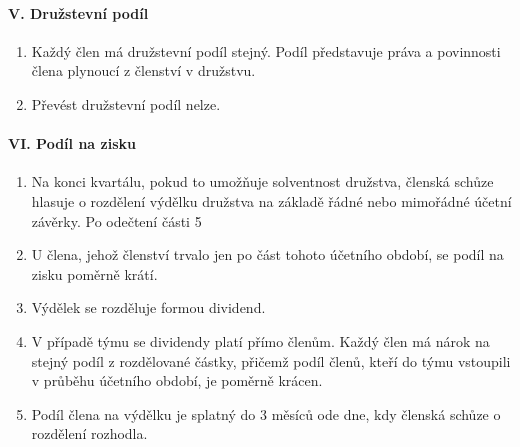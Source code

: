 \paragraph{V. Družstevní podíl}
\begin{enumerate}
    \item Každý člen má družstevní podíl stejný. Podíl představuje práva a povinnosti člena plynoucí z členství v družstvu.
    \item Převést družstevní podíl nelze.
\end{enumerate}

\paragraph{VI. Podíl na zisku}
\begin{enumerate}
    \item Na konci kvartálu, pokud to umožňuje solventnost družstva, členská schůze hlasuje o rozdělení výdělku družstva na základě řádné nebo mimořádné účetní závěrky. Po odečtení části 5%
    \item U člena, jehož členství trvalo jen po část tohoto účetního období, se podíl na zisku poměrně krátí.
    \item Výdělek se rozděluje formou dividend. 
    \item V případě týmu se dividendy platí přímo členům. Každý člen má nárok na stejný podíl z rozdělované částky, přičemž podíl členů, kteří do týmu vstoupili v průběhu účetního období, je poměrně krácen.
    \item Podíl člena na výdělku je splatný do 3 měsíců ode dne, kdy členská schůze o rozdělení rozhodla.
\end{enumerate}

